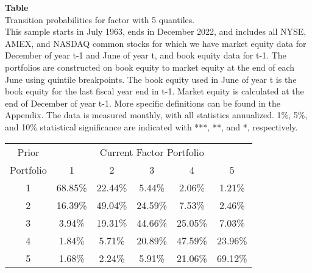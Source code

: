 \begin{table*}[ht!]
\raggedright
{}
\label{tab: transition_probs_BE_ME_with_5_quantiles}
\textbf{Table \thetable} \\
Transition probabilities for factor with 5 quantiles. \\
\hspace*{1em}This sample starts in July 1963, ends in December 2022, and includes all NYSE, AMEX, and NASDAQ common stocks for which we have market equity data for December of year t-1 and June of year t, and book equity data for t-1. The portfolios are constructed on book equity to market equity at the end of each June using quintile breakpoints.  The book equity used in June of year t is the book equity for the last fiscal year end in t-1.  Market equity is calculated at the end of December of year t-1.  More specific definitions can be found in the Appendix.  The data is measured monthly, with all statistics annualized.  1\%, 5\%, and 10\% statistical significance are indicated with ***, **, and *, respectively. \\
\vspace{0.5em}
\centering
\begin{adjustbox}{max width=\textwidth}
\begin{tabular}{@{}cccccc@{}}
\toprule
Prior & \multicolumn{5}{c}{Current Factor Portfolio} \\
Portfolio & 1 & 2 & 3 & 4 & 5 \\
\midrule
1 & 68.85\% & 22.44\% & 5.44\% & 2.06\% & 1.21\% \\
2 & 16.39\% & 49.04\% & 24.59\% & 7.53\% & 2.46\% \\
3 & 3.94\% & 19.31\% & 44.66\% & 25.05\% & 7.03\% \\
4 & 1.84\% & 5.71\% & 20.89\% & 47.59\% & 23.96\% \\
5 & 1.68\% & 2.24\% & 5.91\% & 21.06\% & 69.12\% \\
\bottomrule
\end{tabular}
\end{adjustbox}
\end{table*}